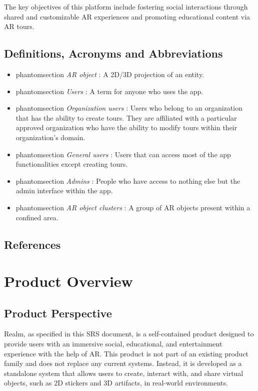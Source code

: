 \documentclass{article}
\makeatletter
\newcommand{\labeltext}[3][]{%
    \@bsphack%
    \csname phantomsection\endcsname%
    \def\tst{#1}%
    \def\labelmarkup{\emph}%
    \def\refmarkup{}%
    \ifx\tst\empty\def\@currentlabel{\refmarkup{#2}}{\label{#3}}%
    \else\def\@currentlabel{\refmarkup{#1}}{\label{#3}}\fi%
    \@esphack%
    \labelmarkup{#2}%
}
\makeatother
\begin{document}
The key objectives of this platform include fostering social interactions through shared and customizable AR experiences and promoting educational content via AR tours.

\subsection{Definitions, Acronyms and Abbreviations}
\label{sub:def_acr_abb}

\begin{itemize}
    \item \labeltext{AR object}{def:ar_obj}: A 2D/3D projection of an entity.
    \item \labeltext{Users}{def:user}: A term for anyone who uses the app.
    \item \labeltext{Organization users}{def:org_user}: Users who belong to an organization that has the ability to create tours. They are affiliated with a particular approved organization who have the ability to modify tours within their organization’s domain.
    \item \labeltext{General users}{def:gen_user}: Users that can access most of the app functionalities except creating tours.
    \item \labeltext{Admins}{def:admin}: People who have access to nothing else but the admin interface within the app.
    \item \labeltext{AR object clusters}{def:ar_obj_cls}: A group of AR objects present within a confined area.
\end{itemize}

\subsection{References}
\label{sub:references}

\begingroup
\raggedright

\endgroup


\section{Product Overview}

\subsection{Product Perspective}

Realm, as specified in this SRS document, is a self-contained product designed to provide users with an immersive social, educational, and entertainment experience with the help of AR. This product is not part of an existing product family and does not replace any current systems. Instead, it is developed as a standalone system that allows users to create, interact with, and share virtual objects, such as 2D stickers and 3D artifacts, in real-world environments.\\
\end{document}
